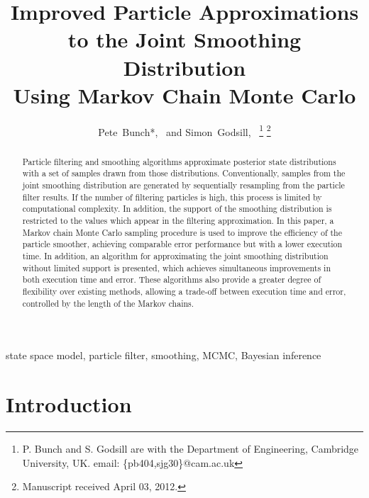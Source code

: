 \documentclass[10pt,twocolumn,twoside]{IEEEtran}
\begin{document}
\title{Improved Particle Approximations \\ to the Joint Smoothing Distribution \\ Using Markov Chain Monte Carlo}

\author{Pete~Bunch*,~ and
        Simon~Godsill,~%
\thanks{P. Bunch and S. Godsill are with the Department
of Engineering, Cambridge University, UK. email: \{pb404,sjg30\}@cam.ac.uk}%
\thanks{Manuscript received April 03, 2012.}}


\maketitle


\begin{abstract}
Particle filtering and smoothing algorithms approximate posterior state distributions with a set of samples drawn from those distributions. Conventionally, samples from the joint smoothing distribution are generated by sequentially resampling from the particle filter results. If the number of filtering particles is high, this process is limited by computational complexity. In addition, the support of the smoothing distribution is restricted to the values which appear in the filtering approximation. In this paper, a Markov chain Monte Carlo sampling procedure is used to improve the efficiency of the particle smoother, achieving comparable error performance but with a lower execution time. In addition, an algorithm for approximating the joint smoothing distribution without limited support is presented, which achieves simultaneous improvements in both execution time and error. These algorithms also provide a greater degree of flexibility over existing methods, allowing a trade-off between execution time and error, controlled by the length of the Markov chains.
\end{abstract}



\begin{IEEEkeywords}
state space model, particle filter, smoothing, MCMC, Bayesian inference
\end{IEEEkeywords}



\section{Introduction} \label{sec:intro}
\end{document}
